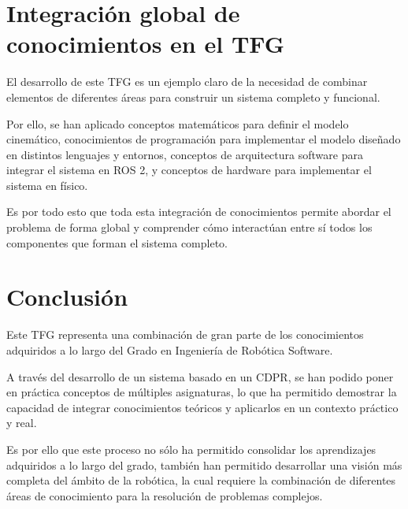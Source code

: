 \section{Integración global de conocimientos en el TFG}
\label{sec:segundaseccion}

El desarrollo de este TFG es un ejemplo claro de la necesidad de combinar elementos de diferentes áreas para construir un sistema completo y funcional.

\vspace{0.25cm}

Por ello, se han aplicado conceptos matemáticos para definir el modelo cinemático, conocimientos de programación para implementar el modelo diseñado en distintos lenguajes y entornos, conceptos de arquitectura software para integrar el sistema en ROS 2, y conceptos de hardware para implementar el sistema en físico.

\vspace{0.25cm}

Es por todo esto que toda esta integración de conocimientos permite abordar el problema de forma global y comprender cómo interactúan entre sí todos los componentes que forman el sistema completo.

\newpage

\section{Conclusión}
\label{sec:segundaseccion}

Este TFG representa una combinación de gran parte de los conocimientos adquiridos a lo largo del Grado en Ingeniería de Robótica Software.

\vspace{0.25cm}

A través del desarrollo de un sistema basado en un CDPR, se han podido poner en práctica conceptos de múltiples asignaturas, lo que ha permitido demostrar la capacidad de integrar conocimientos teóricos y aplicarlos en un contexto práctico y real.

\vspace{0.25cm}

Es por ello que este proceso no sólo ha permitido consolidar los aprendizajes adquiridos a lo largo del grado, también han permitido desarrollar una visión más completa del ámbito de la robótica, la cual requiere la combinación de diferentes áreas de conocimiento para la resolución de problemas complejos.
